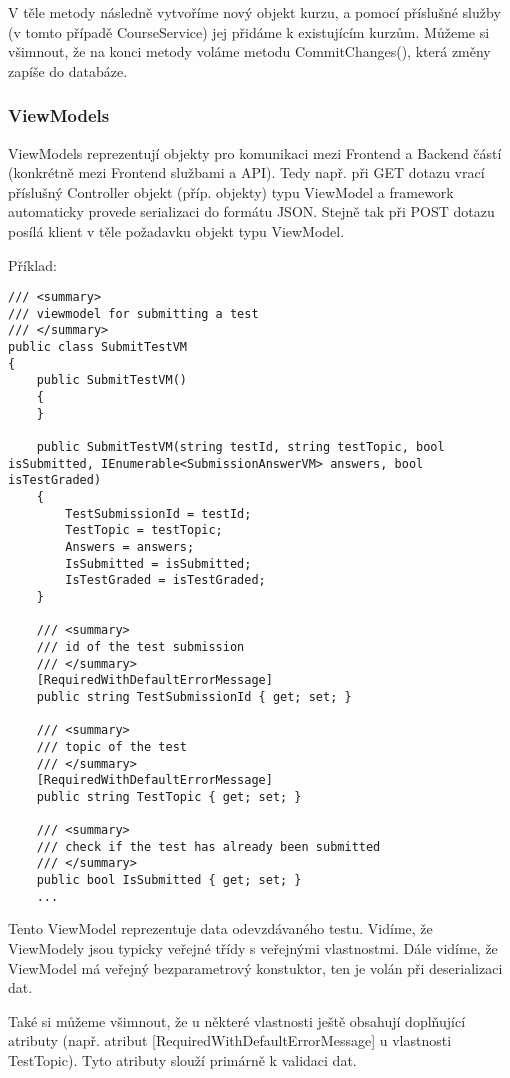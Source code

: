 V těle metody následně vytvoříme nový objekt kurzu, a pomocí příslušné služby (v tomto případě CourseService) jej přidáme k existujícím kurzům. Můžeme si všimnout, že na konci metody voláme metodu CommitChanges(), která změny zapíše do databáze.

\subsubsection*{ViewModels}
\label{serverVM}

ViewModels reprezentují objekty pro komunikaci mezi Frontend a Backend částí (konkrétně mezi Frontend službami a API). Tedy např. při GET dotazu vrací příslušný Controller objekt (příp. objekty) typu ViewModel a framework automaticky provede serializaci do formátu JSON. Stejně tak při POST dotazu posílá klient v těle požadavku objekt typu ViewModel.

Příklad:
\begin{lstlisting}
/// <summary>
/// viewmodel for submitting a test
/// </summary>
public class SubmitTestVM
{
	public SubmitTestVM()
	{
	}
	
	public SubmitTestVM(string testId, string testTopic, bool isSubmitted, IEnumerable<SubmissionAnswerVM> answers, bool isTestGraded)
	{
		TestSubmissionId = testId;
		TestTopic = testTopic;
		Answers = answers;
		IsSubmitted = isSubmitted;
		IsTestGraded = isTestGraded;
	}
	
	/// <summary>
	/// id of the test submission
	/// </summary>
	[RequiredWithDefaultErrorMessage]
	public string TestSubmissionId { get; set; }
	
	/// <summary>
	/// topic of the test
	/// </summary>
	[RequiredWithDefaultErrorMessage]
	public string TestTopic { get; set; }
	
	/// <summary>
	/// check if the test has already been submitted
	/// </summary>
	public bool IsSubmitted { get; set; }
	...
\end{lstlisting}

Tento ViewModel reprezentuje data odevzdávaného testu. Vidíme, že ViewModely jsou typicky veřejné třídy s veřejnými vlastnostmi. Dále vidíme, že ViewModel má veřejný bezparametrový konstuktor, ten je volán při deserializaci dat.

Také si můžeme všimnout, že u některé vlastnosti ještě obsahují doplňující atributy (např. atribut [RequiredWithDefaultErrorMessage] u vlastnosti TestTopic). Tyto atributy slouží primárně k validaci dat.

